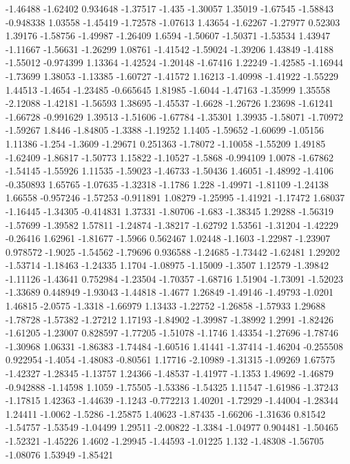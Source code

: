 \documentclass[9pt]{article}
\theoremstyle{plain}
\theoremstyle{definition}
\theoremstyle{remark}
\numberwithin{equation}{section}
\begin{document}
-1.46488
-1.62402
0.934648
-1.37517
-1.435
-1.30057
1.35019
-1.67545
-1.58843
-0.948338
1.03558
-1.45419
-1.72578
-1.07613
1.43654
-1.62267
-1.27977
0.52303
1.39176
-1.58756
-1.49987
-1.26409
1.6594
-1.50607
-1.50371
-1.53534
1.43947
-1.11667
-1.56631
-1.26299
1.08761
-1.41542
-1.59024
-1.39206
1.43849
-1.4188
-1.55012
-0.974399
1.13364
-1.42524
-1.20148
-1.67416
1.22249
-1.42585
-1.16944
-1.73699
1.38053
-1.13385
-1.60727
-1.41572
1.16213
-1.40998
-1.41922
-1.55229
1.44513
-1.4654
-1.23485
-0.665645
1.81985
-1.6044
-1.47163
-1.35999
1.35558
-2.12088
-1.42181
-1.56593
1.38695
-1.45537
-1.6628
-1.26726
1.23698
-1.61241
-1.66728
-0.991629
1.39513
-1.51606
-1.67784
-1.35301
1.39935
-1.58071
-1.70972
-1.59267
1.8446
-1.84805
-1.3388
-1.19252
1.1405
-1.59652
-1.60699
-1.05156
1.11386
-1.254
-1.3609
-1.29671
0.251363
-1.78072
-1.10058
-1.55209
1.49185
-1.62409
-1.86817
-1.50773
1.15822
-1.10527
-1.5868
-0.994109
1.0078
-1.67862
-1.54145
-1.55926
1.11535
-1.59023
-1.46733
-1.50436
1.46051
-1.48992
-1.4106
-0.350893
1.65765
-1.07635
-1.32318
-1.1786
1.228
-1.49971
-1.81109
-1.24138
1.66558
-0.957246
-1.57253
-0.911891
1.08279
-1.25995
-1.41921
-1.17472
1.68037
-1.16445
-1.34305
-0.414831
1.37331
-1.80706
-1.683
-1.38345
1.29288
-1.56319
-1.57699
-1.39582
1.57811
-1.24874
-1.38217
-1.62792
1.53561
-1.31204
-1.42229
-0.26416
1.62961
-1.81677
-1.5966
0.562467
1.02448
-1.1603
-1.22987
-1.23907
0.978572
-1.9025
-1.54562
-1.79696
0.936588
-1.24685
-1.73442
-1.62481
1.29202
-1.53714
-1.18463
-1.24335
1.1704
-1.08975
-1.15009
-1.3507
1.12579
-1.39842
-1.11126
-1.43641
0.752984
-1.23504
-1.70357
-1.68716
1.51904
-1.73091
-1.52023
-1.33689
0.448949
-1.93043
-1.44818
-1.4677
1.26849
-1.49146
-1.49793
-1.0201
1.46815
-2.0575
-1.3318
-1.66979
1.13433
-1.22752
-1.26858
-1.57933
1.29688
-1.78728
-1.57382
-1.27212
1.17193
-1.84902
-1.39987
-1.38992
1.2991
-1.82426
-1.61205
-1.23007
0.828597
-1.77205
-1.51078
-1.1746
1.43354
-1.27696
-1.78746
-1.30968
1.06331
-1.86383
-1.74484
-1.60516
1.41441
-1.37414
-1.46204
-0.255508
0.922954
-1.4054
-1.48083
-0.80561
1.17716
-2.10989
-1.31315
-1.09269
1.67575
-1.42327
-1.28345
-1.13757
1.24366
-1.48537
-1.41977
-1.1353
1.49692
-1.46879
-0.942888
-1.14598
1.1059
-1.75505
-1.53386
-1.54325
1.11547
-1.61986
-1.37243
-1.17815
1.42363
-1.44639
-1.1243
-0.772213
1.40201
-1.72929
-1.44004
-1.28344
1.24411
-1.0062
-1.5286
-1.25875
1.40623
-1.87435
-1.66206
-1.31636
0.81542
-1.54757
-1.53549
-1.04499
1.29511
-2.00822
-1.3384
-1.04977
0.904481
-1.50465
-1.52321
-1.45226
1.4602
-1.29945
-1.44593
-1.01225
1.132
-1.48308
-1.56705
-1.08076
1.53949
-1.85421
\end{document}
